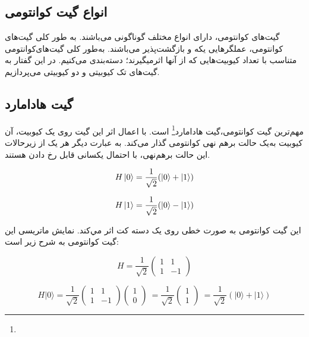\documentclass{book}
\begin{document}
\subsection{انواع گیت کوانتومی}
گیت‌های کوانتومی، دارای انواع مختلف گوناگونی می‌باشند. به طور کلی گیت‌های کوانتومی، عملگر‌هایی یکه و بازگشت‌پذیر می‌باشند. به‌طور کلی گیت‌های‌کوانتومی متناسب با تعداد کیوبیت‌هایی که از آنها اثر‌میگیرند؛ دسته‌بندی می‌کنیم. در این گفتار به گیت‌های تک کیوبیتی و دو کیوبیتی می‌پردازیم.
\subsection*{گیت هادامارد}
مهم‌ترین گیت کوانتومی،‌گیت هادامارد\footnote{} است. با اعمال اثر این گیت روی یک کیوبیت، آن کیوبیت به‌یک حالت برهم نهی‌ کوانتومی‌ گذار‌ می‌کند. به عبارت دیگر هر یک از زیرحالات این حالت برهم‌نهی، با احتمال یکسانی قابل رخ دادن‌ هستند. 
\vspace{1cm}


\begin{center}
	\begin{equation}\label{basis to forier}
H\ket{0} = \frac{1}{\sqrt{2}} (\ket{0} + \ket{1})
\end{equation}
\end{center}
\hspace{1cm}
\begin{center}
	\begin{equation}\label{basis to forier}
H\ket{1} = \frac{1}{\sqrt{2}} (\ket{0} - \ket{1})
\end{equation}
\end{center}
\vspace{1cm}
\pagebreak
این گیت کوانتومی‌ به صورت خطی روی یک دسته‌ کت اثر مي‌کند. نمایش ماتریسی این گیت‌ کوانتومی به شرح زیر است:
\begin{center}
	\begin{equation}\label{Hadamard matrix}
		H = \frac{1}{\sqrt{2}}
		\begin{pmatrix}
			1 & 1 \\
			1 & -1
		\end{pmatrix}
	\end{equation}
\end{center}





	\begin{equation}\label{Hadamard matrix}
			H |0\rangle = \frac{1}{\sqrt{2}} \begin{pmatrix} 1 & 1 \\ 1 & -1 \end{pmatrix} \begin{pmatrix} 1 \\ 0 \end{pmatrix} \
		= \frac{1}{\sqrt{2}} \begin{pmatrix} 1 \\ 1 \end{pmatrix} \
		= \frac{1}{\sqrt{2}} (|0\rangle + |1\rangle)
	\end{equation}
\end{document}
